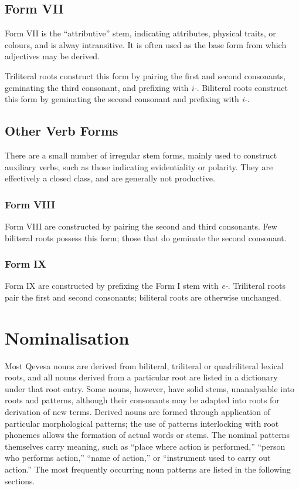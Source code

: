 \documentclass[grammar]{subfiles}
\begin{document}
  \subsection{Form VII}
  \label{ssec:dev_verb_form_vii}

  Form VII is the “attributive” stem, indicating attributes, physical traits, or colours, and is alway intransitive. It is often used as the base form from which adjectives may be derived.

  Triliteral roots construct this form by pairing the first and second consonants, geminating the third consonant, and prefixing with \textit{i-}. Biliteral roots construct this form by geminating the second consonant and prefixing with \textit{i-}.

  \subsection{Other Verb Forms}
  \label{ssec:dev_other_verb_forms}

  There are a small number of irregular stem forms, mainly used to construct auxiliary verbs, such as those indicating evidentiality or polarity. They are effectively a closed class, and are generally not productive.

  \subsubsection{Form VIII}
  \label{sssec:dev_verb_form_viii}

  Form VIII are constructed by pairing the second and third consonants. Few biliteral roots possess this form; those that do geminate the second consonant.

  \subsubsection{Form IX}
  \label{sssec:dev_verb_form_ix}

  Form IX are constructed by prefixing the Form I stem with \textit{e-}. Triliteral roots pair the first and second consonants; biliteral roots are otherwise unchanged.

  \section{Nominalisation}
  \label{sec:dev_nominalisation}

  Most Qevesa nouns are derived from biliteral, triliteral or quadriliteral lexical roots, and all nouns derived from a particular root are listed in a dictionary under that root entry. Some nouns, however, have solid stems, unanalysable into roots and patterns, although their consonants may be adapted into roots for derivation of new terms. Derived nouns are formed through application of particular morphological patterns; the use of patterns interlocking with root phonemes allows the formation of actual words or stems. The nominal patterns themselves carry meaning, such as “place where action is performed,” “person who performs action,” “name of action,” or “instrument used to carry out action.” The most frequently occurring noun patterns are listed in the following sections.
\end{document}
